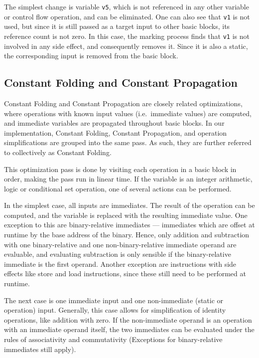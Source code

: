 \documentclass[course=eragp]{aspdoc}
\begin{document}
The simplest change is variable \texttt{v5}, which is not referenced in any other variable or control flow operation,
and can be eliminated. One can also see that \texttt{v1} is not used, but since it is still passed
as a target input to
other basic blocks, its reference count is not zero. In this case, the marking process finds that \texttt{v1} is not
involved in any side effect, and consequently removes it. Since it is also a static, the corresponding input is removed
from the basic block.

\subsection{Constant Folding and Constant Propagation}\label{constant_folding}

Constant Folding and Constant Propagation are closely related optimizations, where operations with known input values
(i.e.\ immediate values) are computed, and immediate variables are propagated throughout basic blocks.
In our implementation, Constant Folding, Constant Propagation, and operation simplifications are grouped into the same
pass. As such, they are further referred to collectively as Constant Folding.

This optimization pass is done by visiting each operation in a basic block in order, making the pass run in linear time.
If the variable is an integer arithmetic, logic or conditional set operation, one of several actions can be performed.

In the simplest case, all inputs are immediates. The result of the operation can be computed, and the variable is
replaced with the resulting immediate value. One exception to this are binary-relative immediates
--- immediates which are
offset at runtime by the base address of the binary. Hence, only addition and subtraction with one binary-relative and
one non-binary-relative immediate operand are evaluable, and evaluating subtraction is only sensible if the
binary-relative immediate is the first operand. Another exception are instructions with side effects
like store and load instructions, since these still
need to be performed at runtime.

The next case is one immediate input and one non-immediate (static or operation) input. Generally, this case allows for
simplification of identity operations, like addition with zero. If the non-immediate operand is an operation with an
immediate operand itself, the two immediates can be evaluated under the rules of associativity and commutativity
(Exceptions for binary-relative immediates still apply).
\end{document}
